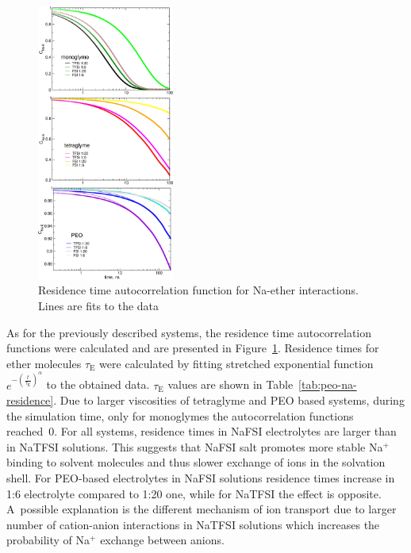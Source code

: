 \begin{figure}[ht]
    \centering
    \includegraphics[width=0.4\textwidth]{img/3-structural-data-from-md-simulations/5-peo-na/residence.png}
    \caption{Residence time autocorrelation function for Na-ether interactions. Lines are fits to the data}
    \label{fig:peo-na-residence}
\end{figure}

As for the previously described systems, the residence time autocorrelation functions were calculated and are presented in Figure~\ref{fig:peo-na-residence}. Residence times for ether molecules $\tau_{\text{E}}$ were calculated by fitting stretched exponential function $e^{-\left( \frac{t}{\tau_{\text{E}}} \right)^{\alpha}}$ to the obtained data. $\tau_{\text{E}}$ values are shown in Table~\ref{tab:peo-na-residence}. Due to larger viscosities of tetraglyme and PEO based systems, during the simulation time, only for monoglymes the autocorrelation functions reached~0. For all systems, residence times in NaFSI electrolytes are larger than in NaTFSI solutions. This suggests that NaFSI salt promotes more stable Na$^{+}$ binding to solvent molecules and thus slower exchange of ions in the solvation shell. For PEO-based electrolytes in NaFSI solutions residence times increase in 1:6 electrolyte compared to 1:20 one, while for NaTFSI the effect is opposite. A~possible explanation is the different mechanism of ion transport due to larger number of cation-anion interactions in NaTFSI solutions which increases the probability of Na$^{+}$ exchange between anions.

